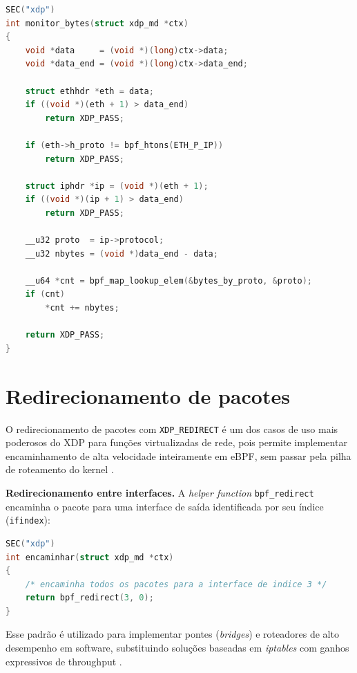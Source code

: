 \begin{lstlisting}[language=C,
  caption={Programa XDP de monitoramento de bytes por protocolo L4.}]
SEC("xdp")
int monitor_bytes(struct xdp_md *ctx)
{
    void *data     = (void *)(long)ctx->data;
    void *data_end = (void *)(long)ctx->data_end;

    struct ethhdr *eth = data;
    if ((void *)(eth + 1) > data_end)
        return XDP_PASS;

    if (eth->h_proto != bpf_htons(ETH_P_IP))
        return XDP_PASS;

    struct iphdr *ip = (void *)(eth + 1);
    if ((void *)(ip + 1) > data_end)
        return XDP_PASS;

    __u32 proto  = ip->protocol;
    __u32 nbytes = (void *)data_end - data;

    __u64 *cnt = bpf_map_lookup_elem(&bytes_by_proto, &proto);
    if (cnt)
        *cnt += nbytes;

    return XDP_PASS;
}
\end{lstlisting}

\section{Redirecionamento de pacotes}

O redirecionamento de pacotes com \texttt{XDP\_REDIRECT} é um dos casos de uso
mais poderosos do XDP para funções virtualizadas de rede, pois permite implementar
encaminhamento de alta velocidade inteiramente em eBPF, sem passar pela pilha
de roteamento do kernel \cite{linuxkernel2024}.

\textbf{Redirecionamento entre interfaces.}
A \textit{helper function} \texttt{bpf\_redirect} encaminha o pacote para uma
interface de saída identificada por seu índice (\texttt{ifindex}):

\begin{lstlisting}[language=C,
  caption={Redirecionamento de pacote para outra interface com XDP.}]
SEC("xdp")
int encaminhar(struct xdp_md *ctx)
{
    /* encaminha todos os pacotes para a interface de indice 3 */
    return bpf_redirect(3, 0);
}
\end{lstlisting}

Esse padrão é utilizado para implementar pontes (\textit{bridges}) e roteadores
de alto desempenho em software, substituindo soluções baseadas em \textit{iptables}
com ganhos expressivos de throughput \cite{gregg2019}.

